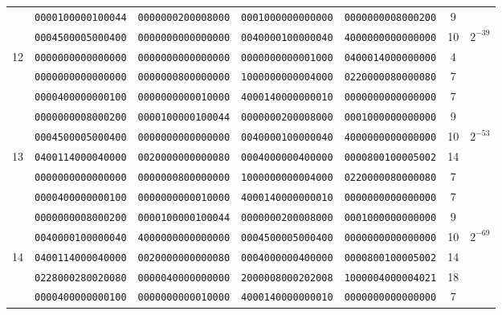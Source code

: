 \begin{table}[!tb]
\begin{center}
{\begin{tabular}{ccccccc}
      & {\tt 0000100000100044} & {\tt 0000000200008000} & {\tt 0001000000000000} & {\tt 0000000008000200} & 9  & \\
      & {\tt 0004500005000400} & {\tt 0000000000000000} & {\tt 0040000100000040} & {\tt 4000000000000000} & 10 & \multirow{3}{*}{$2^{-39}$}\\
12    & {\tt 0000000000000000} & {\tt 0000000000000000} & {\tt 0000000000001000} & {\tt 0400014000000000} & 4  & \\
      & {\tt 0000000000000000} & {\tt 0000000800000000} & {\tt 1000000000004000} & {\tt 0220000080000080} & 7  & \\
      & {\tt 0000400000000100} & {\tt 0000000000010000} & {\tt 4000140000000010} & {\tt 0000000000000000} & 7  & \\ \hline

      & {\tt 0000000008000200} & {\tt 0000100000100044} & {\tt 0000000200008000} & {\tt 0001000000000000} & 9  & \\
      & {\tt 0004500005000400} & {\tt 0000000000000000} & {\tt 0040000100000040} & {\tt 4000000000000000} & 10 & \multirow{3}{*}{$2^{-53}$}\\
13    & {\tt 0400114000040000} & {\tt 0020000000000080} & {\tt 0004000000400000} & {\tt 0000800100005002} & 14 &\\
      & {\tt 0000000000000000} & {\tt 0000000800000000} & {\tt 1000000000004000} & {\tt 0220000080000080} & 7  & \\
      & {\tt 0000400000000100} & {\tt 0000000000010000} & {\tt 4000140000000010} & {\tt 0000000000000000} & 7  & \\ \hline

      & {\tt 0000000008000200} & {\tt 0000100000100044} & {\tt 0000000200008000} & {\tt 0001000000000000} & 9  & \\
      & {\tt 0040000100000040} & {\tt 4000000000000000} & {\tt 0004500005000400} & {\tt 0000000000000000} & 10 & \multirow{3}{*}{$2^{-69}$}\\
14    & {\tt 0400114000040000} & {\tt 0020000000000080} & {\tt 0004000000400000} & {\tt 0000800100005002} & 14 & \\
      & {\tt 0228000280020080} & {\tt 0000040000000000} & {\tt 2000008000202008} & {\tt 1000004000004021} & 18 & \\
      & {\tt 0000400000000100} & {\tt 0000000000010000} & {\tt 4000140000000010} & {\tt 0000000000000000} & 7  & \\ \hline


\end{tabular}}
\end{center}
\end{table}
